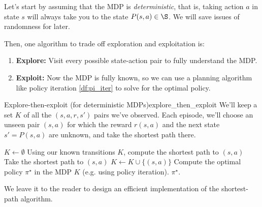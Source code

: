 \documentclass[\main/main]{subfiles}
\begin{document}
Let's start by assuming that the MDP is \emph{deterministic}, that is, taking action $a$ in state $s$ will always take you to the state $P(s, a) \in \S$. We will save issues of randomness for later.

Then, one algorithm to trade off exploration and exploitation is:

\begin{enumerate}
    \item \textbf{Explore:} Visit every possible state-action pair to fully understand the MDP.
    \item \textbf{Exploit:} Now the MDP is fully known, so we can use a planning algorithm like policy iteration \eqref{df:pi_iter} to solve for the optimal policy.
\end{enumerate}

\begin{definition}{Explore-then-exploit (for deterministic MDPs)}{explore_then_exploit}
    We'll keep a set $K$ of all the $(s, a, r, s')$ pairs we've observed.
    Each episode, we'll choose an unseen pair $(s, a)$ for which the reward $r(s, a)$ and the next state $s' = P(s, a)$ are unknown, and take the shortest path there.

    \begin{algorithmic}
        \State $K \gets \emptyset$
        \State Using our known transitions $K$, compute the shortest path to $(s, a)$
        \State Take the shortest path to $(s, a)$
        \State $K \gets K \cup \{ (s, a) \}$
        \EndWhile
        \State Compute the optimal policy $\pi^\star$ in the MDP $K$ (e.g. using policy iteration).
        \State \Return $\pi^\star$.
    \end{algorithmic}

    We leave it to the reader to design an efficient implementation of the shortest-path algorithm.
\end{definition}
\end{document}
